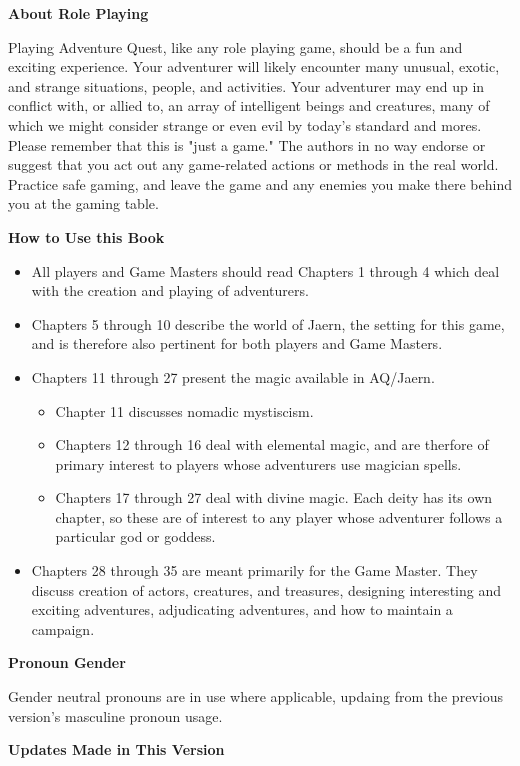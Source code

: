 \textbf{About Role Playing}

Playing Adventure Quest, like any role playing game, should be a fun and exciting experience. Your adventurer will likely encounter many unusual, exotic, and strange situations, people, and activities. Your adventurer may end up in conflict with, or allied to, an array of intelligent beings and creatures, many of which we might consider strange or even evil by today’s standard and mores. Please remember that this is "just a game." The authors in no way endorse or suggest that you act out any game-related actions or methods in the real world. Practice safe gaming, and leave the game and any enemies you make there behind you at the gaming table.

\textbf{How to Use this Book}
\begin{itemize}
\item All players and Game Masters should read Chapters 1 through 4 which deal with the creation and playing of adventurers.
\item Chapters 5 through 10 describe the world of Jaern, the setting for this game, and is therefore also pertinent for both players and Game Masters.
\item Chapters 11 through 27 present the magic available in AQ/Jaern. 
\begin{itemize}
\item Chapter 11 discusses nomadic mystiscism. 
\item Chapters 12 through 16 deal with elemental magic, and are therfore of primary interest to players whose adventurers use magician spells.
\item Chapters 17 through 27 deal with divine magic. Each deity has its own chapter, so these are of interest to any player whose adventurer follows a particular god or goddess.
\end{itemize}
\item Chapters 28 through 35 are meant primarily for the Game Master. They discuss creation of actors, creatures, and treasures, designing interesting and exciting adventures, adjudicating adventures, and how to maintain a campaign.
\end{itemize}

\textbf{Pronoun Gender}

Gender neutral pronouns are in use where applicable, updaing from the previous version's masculine pronoun usage.

\textbf{Updates Made in This Version}

